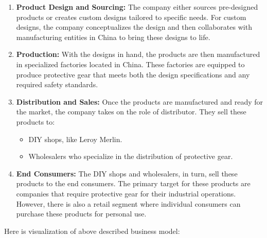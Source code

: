 \documentclass{article}
\begin{document}
\begin{enumerate}
    \item \textbf{Product Design and Sourcing:} 
    The company either sources pre-designed products or creates custom designs tailored to specific needs. For custom designs, the company conceptualizes the design and then collaborates with manufacturing entities in China to bring these designs to life.

    \item \textbf{Production:} 
    With the designs in hand, the products are then manufactured in specialized factories located in China. These factories are equipped to produce protective gear that meets both the design specifications and any required safety standards.

    \item \textbf{Distribution and Sales:} 
    Once the products are manufactured and ready for the market, the company takes on the role of distributor. They sell these products to:
    \begin{itemize}
        \item DIY shops, like Leroy Merlin.
        \item Wholesalers who specialize in the distribution of protective gear.
    \end{itemize}

    \item \textbf{End Consumers:} 
    The DIY shops and wholesalers, in turn, sell these products to the end consumers. The primary target for these products are companies that require protective gear for their industrial operations. However, there is also a retail segment where individual consumers can purchase these products for personal use.
\end{enumerate}

Here is visualization of above described business model:
\end{document}
